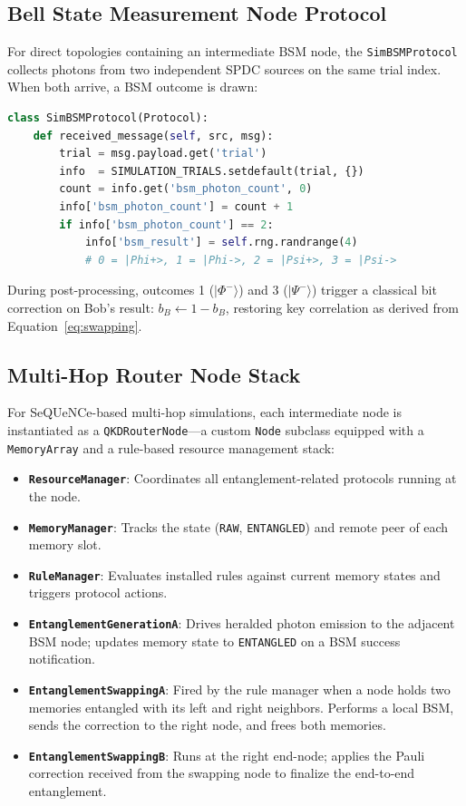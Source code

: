 \documentclass[12pt,oneside,letterpaper,english]{article}
\begin{document}
\subsection{Bell State Measurement Node Protocol}

For direct topologies containing an intermediate BSM node, the \texttt{SimBSMProtocol} collects photons from two independent SPDC sources on the same trial index. When both arrive, a BSM outcome is drawn:

\begin{lstlisting}[language=Python, caption={SimBSMProtocol: joint Bell measurement}]
class SimBSMProtocol(Protocol):
    def received_message(self, src, msg):
        trial = msg.payload.get('trial')
        info  = SIMULATION_TRIALS.setdefault(trial, {})
        count = info.get('bsm_photon_count', 0)
        info['bsm_photon_count'] = count + 1
        if info['bsm_photon_count'] == 2:
            info['bsm_result'] = self.rng.randrange(4)
            # 0 = |Phi+>, 1 = |Phi->, 2 = |Psi+>, 3 = |Psi->
\end{lstlisting}

During post-processing, outcomes 1 ($|\Phi^-\rangle$) and 3 ($|\Psi^-\rangle$) trigger a classical bit correction on Bob's result: $b_B \leftarrow 1 - b_B$, restoring key correlation as derived from Equation~\ref{eq:swapping}.

\subsection{Multi-Hop Router Node Stack}

For SeQUeNCe-based multi-hop simulations, each intermediate node is instantiated as a \texttt{QKDRouterNode}—a custom \texttt{Node} subclass equipped with a \texttt{MemoryArray} and a rule-based resource management stack:

\begin{itemize}
    \item \textbf{\texttt{ResourceManager}}: Coordinates all entanglement-related protocols running at the node.
    \item \textbf{\texttt{MemoryManager}}: Tracks the state (\texttt{RAW}, \texttt{ENTANGLED}) and remote peer of each memory slot.
    \item \textbf{\texttt{RuleManager}}: Evaluates installed rules against current memory states and triggers protocol actions.
    \item \textbf{\texttt{EntanglementGenerationA}}: Drives heralded photon emission to the adjacent BSM node; updates memory state to \texttt{ENTANGLED} on a BSM success notification.
    \item \textbf{\texttt{EntanglementSwappingA}}: Fired by the rule manager when a node holds two memories entangled with its left and right neighbors. Performs a local BSM, sends the correction to the right node, and frees both memories.
    \item \textbf{\texttt{EntanglementSwappingB}}: Runs at the right end-node; applies the Pauli correction received from the swapping node to finalize the end-to-end entanglement.
\end{itemize}
\end{document}
